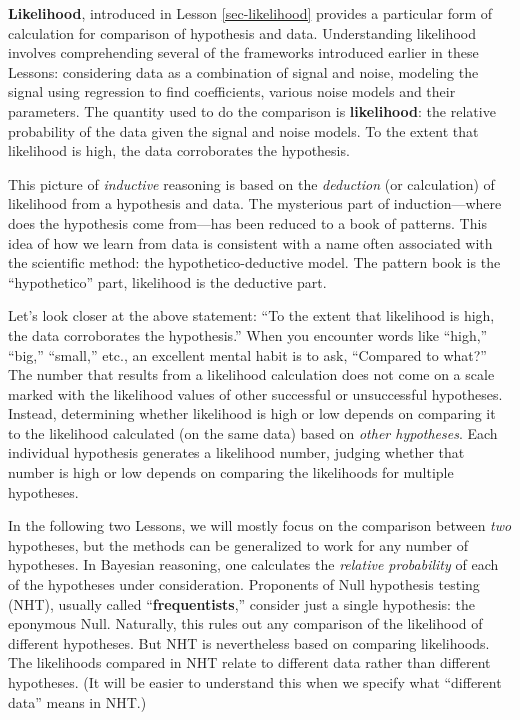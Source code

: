 \documentclass[
  letterpaper,
  DIV=11,
  numbers=noendperiod,
  oneside]{scrartcl}
\begin{document}
\textbf{Likelihood}, introduced in Lesson \ref{sec-likelihood} provides
a particular form of calculation for comparison of hypothesis and data.
Understanding likelihood involves comprehending several of the
frameworks introduced earlier in these Lessons: considering data as a
combination of signal and noise, modeling the signal using regression to
find coefficients, various noise models and their parameters. The
quantity used to do the comparison is \textbf{likelihood}: the relative
probability of the data given the signal and noise models. To the extent
that likelihood is high, the data corroborates the hypothesis.

This picture of \emph{inductive} reasoning is based on the
\emph{deduction} (or calculation) of likelihood from a hypothesis and
data. The mysterious part of induction---where does the hypothesis come
from---has been reduced to a book of patterns. This idea of how we learn
from data is consistent with a name often associated with the scientific
method: the hypothetico-deductive model. The pattern book is the
``hypothetico'' part, likelihood is the deductive part.

Let's look closer at the above statement: ``To the extent that
likelihood is high, the data corroborates the hypothesis.'' When you
encounter words like ``high,'' ``big,'' ``small,'' etc., an excellent
mental habit is to ask, ``Compared to what?'' The number that results
from a likelihood calculation does not come on a scale marked with the
likelihood values of other successful or unsuccessful hypotheses.
Instead, determining whether likelihood is high or low depends on
comparing it to the likelihood calculated (on the same data) based on
\emph{other hypotheses}. Each individual hypothesis generates a
likelihood number, judging whether that number is high or low depends on
comparing the likelihoods for multiple hypotheses.

In the following two Lessons, we will mostly focus on the comparison
between \emph{two} hypotheses, but the methods can be generalized to
work for any number of hypotheses. In Bayesian reasoning, one calculates
the \emph{relative probability} of each of the hypotheses under
consideration. Proponents of Null hypothesis testing (NHT), usually
called ``\textbf{frequentists},'' consider just a single hypothesis: the
eponymous Null. Naturally, this rules out any comparison of the
likelihood of different hypotheses. But NHT is nevertheless based on
comparing likelihoods. The likelihoods compared in NHT relate to
different data rather than different hypotheses. (It will be easier to
understand this when we specify what ``different data'' means in NHT.)
\end{document}

